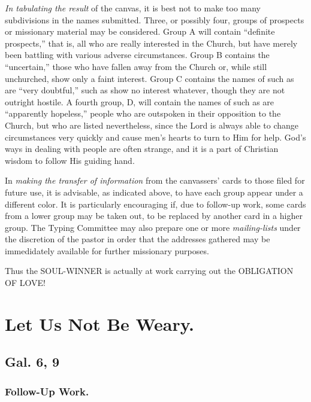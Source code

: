 \documentclass[
]{book}
\begin{document}
\emph{In tabulating the result} of the canvas, it is best not to make too many subdivisions in the names submitted. Three, or possibly four, groups of prospects or missionary material may be considered. Group A will contain ``definite prospects,'' that is, all who are really interested in the Church, but have merely been battling with various adverse circumstances. Group B contains the ``uncertain,'' those who have fallen away from the Church or, while still unchurched, show only a faint interest. Group C contains the names of such as are ``very doubtful,'' such as show no interest whatever, though they are not outright hostile. A fourth group, D, will contain the names of such as are ``apparently hopeless,'' people who are outspoken in their opposition to the Church, but who are listed nevertheless, since the Lord is always able to change circumstances very quickly and cause men's hearts to turn to Him for help. God's ways in dealing with people are often strange, and it is a part of Christian wisdom to follow His guiding hand.

In \emph{making the transfer of information} from the canvassers' cards to those filed for future use, it is advisable, as indicated above, to have each group appear under a different color. It is particularly encouraging if, due to follow-up work, some cards from a lower group may be taken out, to be replaced by another card in a higher group. The Typing Committee may also prepare one or more \emph{mailing-lists} under the discretion of the pastor in order that the addresses gathered may be immedidately available for further missionary purposes.

Thus the SOUL-WINNER is actually at work carrying out the OBLIGATION OF LOVE!

\hypertarget{let-us-not-be-weary.}{%
\chapter{Let Us Not Be Weary.}\label{let-us-not-be-weary.}}

\hypertarget{gal.-6-9}{%
\section*{Gal. 6, 9}\label{gal.-6-9}}

\hypertarget{follow-up-work.}{%
\subsection*{Follow-Up Work.}\label{follow-up-work.}}
\end{document}
